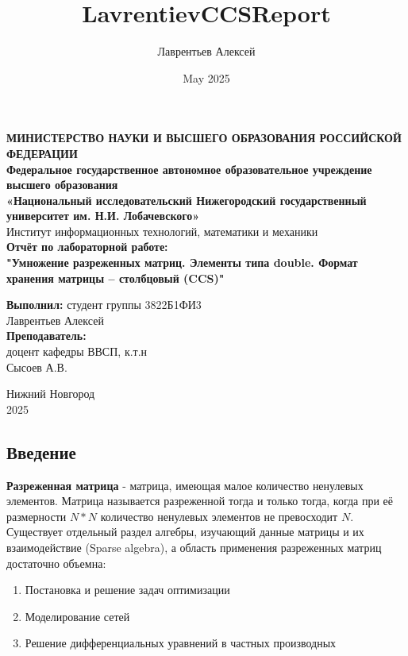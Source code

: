 \documentclass[12pt]{article}
\title{LavrentievCCSReport}
\author{Лаврентьев Алексей}
\date{May 2025}
\begin{document}
\begin{titlepage}
\begin{center}
\textbf{МИНИСТЕРСТВО НАУКИ И ВЫСШЕГО ОБРАЗОВАНИЯ РОССИЙСКОЙ ФЕДЕРАЦИИ} \\
\textbf{Федеральное государственное автономное образовательное учреждение высшего образования \\ «Национальный исследовательский Нижегородский государственный университет им. Н.И. Лобачевского»} \\
Институт информационных технологий, математики и механики \\
\vspace{3cm}
{\Large
\textbf{Отчёт по лабораторной работе:} \\[0.5cm]
\textbf{"Умножение разреженных матриц. Элементы типа double. Формат хранения матрицы – столбцовый (CCS)"} \\
}
\vspace{2cm}
\begin{flushright}
\textbf{Выполнил:} студент группы 3822Б1ФИ3\\
Лаврентьев Алексей \\
\vspace{0.5cm}
\textbf{Преподаватель:} \\
доцент кафедры ВВСП, к.т.н \\ Сысоев А.В.
\end{flushright}
\vspace{2.5cm}
Нижний Новгород \\
2025
\end{center}
\end{titlepage}
\begin{center}
    \section*{Введение}
\end{center}
\textbf{Разреженная матрица} - матрица, имеющая малое количество ненулевых элементов. Матрица называется разреженной тогда и только тогда, когда при её размерности $N*N$ количество ненулевых элементов не превосходит $N$. Существует отдельный раздел алгебры, изучающий данные матрицы и их взаимодействие (Sparse algebra), а область применения разреженных матриц достаточно объемна: 
\begin{enumerate}
    \item Постановка и решение задач оптимизации
    \item Моделирование сетей
    \item Решение дифференциальных уравнений в частных производных
\end{enumerate}
\end{document}
